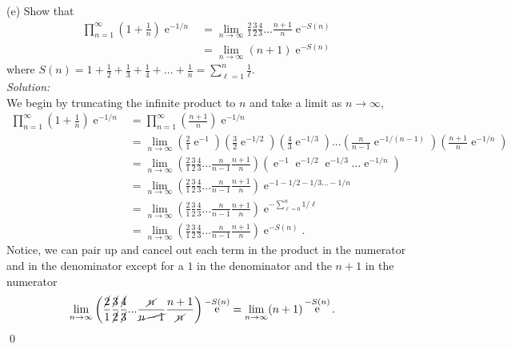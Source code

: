 \documentclass[10pt]{amsart}
\DeclareMathOperator{\E}{e}
\theoremstyle{nonumberplain}
\begin{document}
\begin{enumerate}[label={\bf {\arabic*}:}]
\noindent
(e) Show that
\begin{align*}
\prod_{n=1}^\infty \left(1 + \frac 1 n \right)\E^{-1/n}
	&= \lim_{n\rightarrow\infty} \frac 2 1 \frac 3 2 \frac 4 3 ... \frac {n + 1} n \E^{-S(n)} \\
	&= \lim_{n\rightarrow\infty} (n + 1) \E^{-S(n)}
\end{align*}
where $S(n) = 1 + \frac 1 2 + \frac 1 3 + \frac 1 4 + ... + \frac 1 n = \sum_{\ell=1}^n \frac 1 \ell$. \\

\noindent
\textit{Solution:} \\
We begin by truncating the infinite product to $n$ and take a limit as $n \rightarrow \infty$, 
\begin{align*}
\prod_{n=1}^\infty \left(1 + \frac 1 n \right)\E^{-1/n} 
	&= \prod_{n=1}^\infty \left(\frac {n + 1} n \right)\E^{-1/n} \\
	&= \lim_{n\rightarrow\infty}
		\left(\frac {2} 1 \E^{-1} \right)
		\left(\frac {3} 2 \E^{-1/2} \right)
		\left(\frac {4} 3 \E^{-1/3} \right) ...
		\left(\frac {n} {n - 1} \E^{-1/(n - 1)} \right)
		\left(\frac {n + 1} n \E^{-1/n} \right) \\
	&= \lim_{n\rightarrow\infty}
		\left(\frac {2} 1 \frac {3} 2 \frac {4} 3 ... \frac {n} {n - 1}\frac {n + 1} n \right)
		\left( \E^{-1} \E^{-1/2}\E^{-1/3} ... \E^{-1/n} \right) \\
	&= \lim_{n\rightarrow\infty}
		\left(\frac {2} 1 \frac {3} 2 \frac {4} 3 ... \frac {n} {n - 1}\frac {n + 1} n \right)
		\E^{-1 -1/2 -1/3 ... -1/n} \\
	&= \lim_{n\rightarrow\infty}
		\left(\frac {2} 1 \frac {3} 2 \frac {4} 3 ... \frac {n} {n - 1}\frac {n + 1} n \right)
		\E^{-\sum_{\ell=0}^n 1/\ell} \\
	&= \lim_{n\rightarrow\infty}
		\left(\frac {2} 1 \frac {3} 2 \frac {4} 3 ... \frac {n} {n - 1}\frac {n + 1} n \right) \E^{-S(n)}.
\end{align*}
Notice, we can pair up and cancel out each term in the product in the numerator and in the denominator except for a $1$ in the denominator and the $n + 1$ in the numerator
\begin{align*}
\lim_{n\rightarrow\infty}
	\left(\frac {\cancel{2}} 1 \frac {\cancel{3}} {\cancel{2}} \frac {\cancel{4}} {\cancel{3}} ... \frac {\cancel n} {\cancel{n - 1}}
	\frac {n + 1} {\cancel n} \right) \E^{-S(n)}
&= \lim_{n\rightarrow\infty} (n + 1) \E^{-S(n)}.
\end{align*} \qed \\


\end{enumerate}
\end{document}
